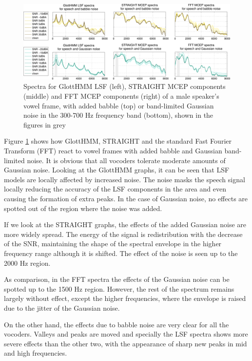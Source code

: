 \begin{figure}[!htb]
\begin{centering}
\includegraphics[width=\textwidth]{images/vowel_frame_and_noise_w_fft.pdf}
\caption{Spectra for GlottHMM LSF (left), STRAIGHT MCEP components (middle) and FFT MCEP components (right) of a male speaker's vowel frame, with added babble (top) or band-limited Gaussian noise in the 300-700 Hz frequency band (bottom), shown in the figures in grey}
\label{fig:different_specs_noise}
\end{centering}
\end{figure}

Figure \ref{fig:different_specs_noise} shows how GlottHMM, STRAIGHT and the standard Fast Fourier Transform (FFT) react to vowel frames with added babble and Gaussian band-limited noise.
%
It is obvious that all vocoders tolerate moderate amounts of Gaussian noise.
%
Looking at the GlottHMM graphs, it can be seen that LSF models are locally affected by increased noise.
%
The noise masks the speech signal locally reducing the accuracy of the LSF components in the area and even causing the formation of extra peaks.
%
In the case of Gaussian noise, no effects are spotted out of the region where the noise was added. 

If we look at the STRAIGHT graphs, the effects of the added Gaussian noise are more widely spread.
%
The energy of the signal is redistribution with the decrease of the SNR, maintaining the shape of the spectral envelope in the higher frequency range although it is shifted.
%
The effect of the noise is seen up to the 2000 Hz region.
%

As comparison, in the FFT spectra the effects of the Gaussian noise can be spotted up to the 1500 Hz region.
%
However, the rest of the spectrum remains largely without effect, except the higher frequencies, where the envelope is raised due to the jitter of the Gaussian noise.

On the other hand, the effects due to babble noise are very clear for all the vocoders.
%
Valleys and peaks are moved and specially the LSF spectra shows more severe effects than the other two, with the appearance of sharp new peaks in mid and high frequencies.

